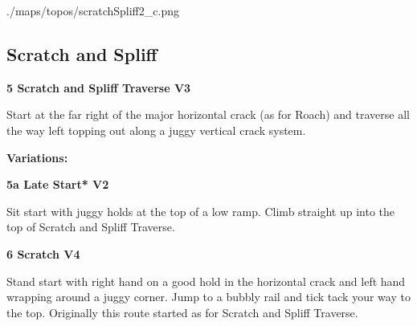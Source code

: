 	\begin{center}
	\begin{overpic}[width=0.9\linewidth]{./maps/topos/scratchSpliff2_c.png}\label{tp:Scratch and Spliff 2}
	\end{overpic}
	\end{center}
	\raggedcolumns
	\begin{multicols}{2}


\needspace{1.5cm}
\subsection*{Scratch and Spliff}\label{bf:Scratch and Spliff}
	


\needspace{1.5cm}
\label{rt:Scratch and Spliff Traverse}
\colorbox{green!20}{
\parbox{0.95\linewidth}{
\textbf{
5 Scratch and Spliff Traverse V3  
}}}
\begin{adjustwidth}{0.5cm}{}			
Start at the far right of the major horizontal crack (as for Roach) and traverse all the way left topping out along a juggy vertical crack system.
\end{adjustwidth}


\begin{adjustwidth}{0.5cm}{}				
\needspace{3cm}
\textbf{Variations:} \newline

\needspace{1.5cm}
\label{vr:Late Start}
\colorbox{green!20}{
\parbox{0.95\linewidth}{
\textbf{
5a Late Start* V2  
}}}
\begin{adjustwidth}{0.5cm}{}			
Sit start with juggy holds at the top of a low ramp. Climb straight up into the top of Scratch and Spliff Traverse.
\end{adjustwidth}



\end{adjustwidth}


\needspace{1.5cm}
\label{rt:Scratch}
\colorbox{RoyalBlue!20}{
\parbox{0.95\linewidth}{
\textbf{
6 Scratch V4  
}}}
\begin{adjustwidth}{0.5cm}{}			
Stand start with right hand on a good hold in the horizontal crack and left hand wrapping around a juggy corner. Jump to a bubbly rail and tick tack your way to the top. Originally this route started as for Scratch and Spliff Traverse.
\end{adjustwidth}




\end{multicols}
